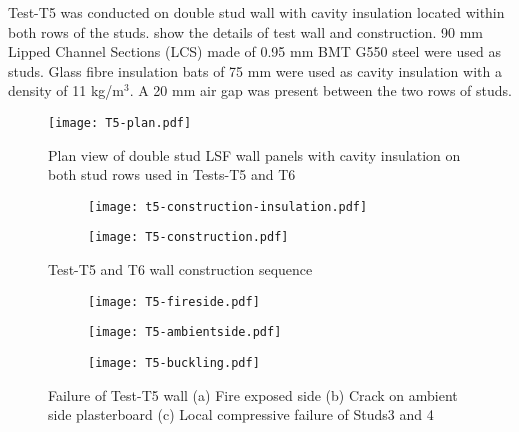 Test-T5 was conducted on double stud wall with cavity insulation located within both rows of the studs.  show the details of test wall and construction. 90 mm Lipped Channel Sections (LCS) made of 0.95 mm BMT G550 steel were used as studs. Glass fibre insulation bats of 75 mm were used as cavity insulation with a density of 11 kg/m\(^3\). A 20 mm air gap was present between the two rows of studs.
\begin{figure}[htbp]
	\centering
		\texttt{[image: T5-plan.pdf]}
		\caption{Plan view of double stud LSF wall panels with cavity insulation on both stud rows used in Tests-T5 and T6}
		\label{fig:T5-plan}
\end{figure} 
\begin{figure}[!htbp]
	\centering
	\begin{subfigure}[b]{0.55\textwidth}
		\centering
		\texttt{[image: t5-construction-insulation.pdf]}
		\caption{}
		\label{subfig:t5-construction-insulation}
	\end{subfigure}
	\begin{subfigure}[b]{0.55\textwidth}
		\centering
		\texttt{[image: T5-construction.pdf]}
		\caption{}
		\label{subfig:T5-construction}
	\end{subfigure}
	   \caption{Test-T5 and T6 wall construction sequence}
	   \label{fig:t5-construction-sequence}
\end{figure}
\begin{figure}[!htbp]
	\centering
	\begin{subfigure}[b]{0.3\textwidth}
		\centering
		\texttt{[image: T5-fireside.pdf]}
		\caption{}
		\label{subfig:T5-fireside}
	\end{subfigure}
	\begin{subfigure}[b]{0.3\textwidth}
		\centering
		\texttt{[image: T5-ambientside.pdf]}
		\caption{}
		\label{subfig:T5-ambientside}
	\end{subfigure}
	\begin{subfigure}[b]{0.3\textwidth}
		\centering
		\texttt{[image: T5-buckling.pdf]}
		\caption{}
		\label{subfig:T5-buckling}
	\end{subfigure}
	   \caption{Failure of Test-T5 wall (a) Fire exposed side (b) Crack on ambient side plasterboard (c) Local compressive failure of Studs3 and 4}
	   \label{fig:T5-failure}
\end{figure}

